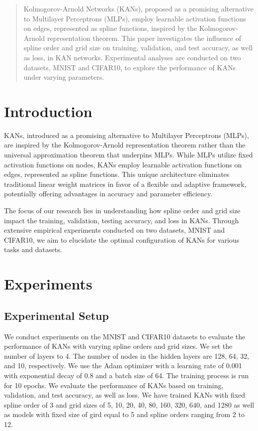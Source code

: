\documentclass{article}
\begin{document}






\begin{abstract}
Kolmogorov-Arnold Networks (KANs), proposed as a promising alternative to Multilayer Perceptrons (MLPs),
employ learnable activation functions on edges, represented as spline functions, inspired by the Kolmogorov-Arnold representation theorem.
This paper investigates the influence of spline order and grid size on training, validation, and test accuracy, as well as loss, in KAN networks.
Experimental analyses are conducted on two datasets, MNIST and CIFAR10, to explore the performance of KANs under varying parameters.
\end{abstract}

\section{Introduction}\label{sec:introduction}

KANs\cite{liu2024kan}, introduced as a promising alternative to Multilayer Perceptrons (MLPs),
are inspired by the Kolmogorov-Arnold representation theorem rather than the universal approximation theorem that underpins MLPs.
While MLPs utilize fixed activation functions on nodes, KANs employ learnable activation functions on edges, represented as spline functions.
This unique architecture eliminates traditional linear weight matrices in favor of a flexible and adaptive framework, potentially offering advantages in accuracy and parameter efficiency.

The focus of our research lies in understanding how spline order and grid size impact the training, validation, testing accuracy, and loss in KANs.
Through extensive empirical experiments conducted on two datasets, MNIST and CIFAR10, we aim to elucidate the optimal configuration of KANs for various tasks and datasets.

\section{Experiments}\label{sec:experiments}

\subsection{Experimental Setup}\label{subsec:experimental-setup}

We conduct experiments on the MNIST and CIFAR10 datasets to evaluate the performance of KANs with varying spline orders and grid sizes.
We set the number of layers to 4.
The number of nodes in the hidden layers are 128, 64, 32, and 10, respectively.
We use the Adam optimizer with a learning rate of 0.001 with exponential decay of 0.8 and a batch size of 64.
The training process is run for 10 epochs.
We evaluate the performance of KANs based on training, validation, and test accuracy, as well as loss.
We have trained KANs with fixed spline order of 3 and grid sizes of 5, 10, 20, 40, 80, 160, 320, 640, and 1280 as well as
models with fixed size of gird equal to 5 and spline orders ranging from 2 to 12.
\end{document}
